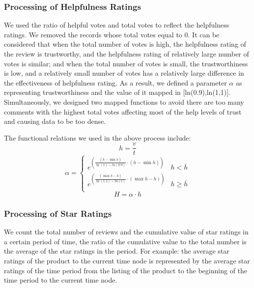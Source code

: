 \documentclass[12pt]{article}
\begin{document}
\subsubsection{Processing of Helpfulness Ratings}
\quad\par\par
We used the ratio of helpful votes and total votes to reflect the helpfulness ratings. We removed the records whose total votes equal to 0. It can be considered that when the total number of votes is high, the helpfulness rating of the review is trustworthy, and the helpfulness rating of relatively large number of votes is similar; and when the total number of votes is small, the trustworthiness is low, and a relatively small number of votes has a relatively large difference in the effectiveness of helpfulness rating. As a result, we defined a parameter $\alpha$ as representing trustworthiness and the value of it mapped in [ln(0.9),ln(1,1)]. Simultaneously, we designed two mapped functions to avoid there are too many comments with the highest total votes affecting most of the help levels of trust and causing data to be too dense.
\par
The functional relations we used in the above process include:
$$h=\frac{v}{t}$$
$$
\alpha=\left\{\begin{matrix}
e^{\left( \frac{\left( \overline{h}-\min h\right)}{\ln \left(1\right)-ln \left(0.9\right)}\cdot\left(h-\min h\right)\right)}& h<\overline{h}\\
e^{\left( \frac{\left( \max h -\overline{h}\right)}{\ln \left(1.1\right)-ln \left(1\right)}\cdot\left(\max h- h\right)\right)}& h\geqslant \overline{h}\\
\end{matrix}\right.
$$
$$H=\alpha \cdot h$$

\subsubsection{Processing of Star Ratings}
\quad\par\par
We count the total number of reviews and the cumulative value of star ratings in a certain period of time, the ratio of the cumulative value to the total number is the average of the star ratings in the period. For example: the average star ratings of the product to the current time node is represented by the average star ratings of the time period from the listing of the product to the beginning of the time period to the current time node.
\end{document}
